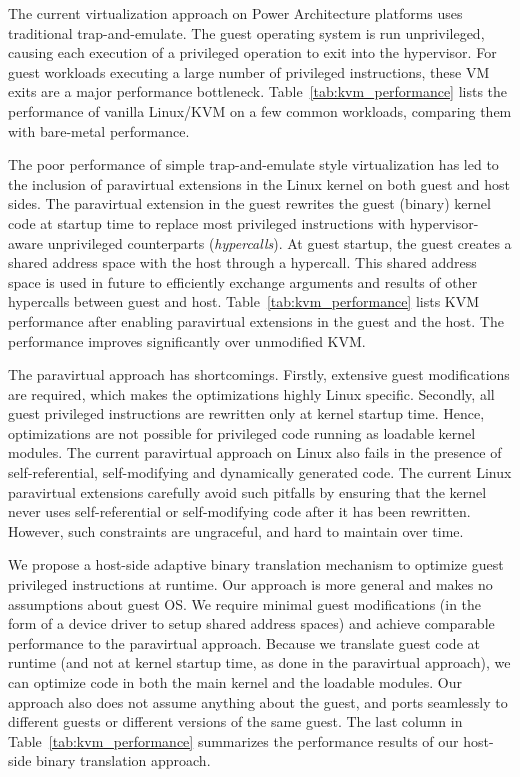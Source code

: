 \documentclass[10pt,twocolumn]{article}
\begin{document}
The current virtualization approach on Power Architecture platforms uses traditional
trap-and-emulate. The guest operating system is run unprivileged, causing each
execution of a privileged
operation to exit into the hypervisor. For guest workloads executing a large number
of privileged instructions, these VM exits are a major performance
bottleneck. Table~\ref{tab:kvm_performance} lists the performance of vanilla Linux/KVM
on a few common workloads, comparing them with bare-metal performance.

The poor performance of simple trap-and-emulate style virtualization has led to
the inclusion of paravirtual extensions in the Linux kernel on both
guest and host sides\cite{pvpower}. The paravirtual extension in the guest
rewrites the guest (binary) kernel
code at startup time to replace most privileged instructions with
hypervisor-aware unprivileged counterparts ({\em hypercalls}).
At guest startup, the guest creates a shared address space with
the host through a hypercall. This shared address space
is used in future to efficiently exchange arguments and results of other hypercalls
between guest and host.
Table~\ref{tab:kvm_performance} lists KVM performance after enabling paravirtual
extensions in the guest and the host. The performance improves significantly over
unmodified KVM.

The paravirtual approach has shortcomings. Firstly, extensive guest
modifications are required, which makes the optimizations highly Linux specific.
Secondly, all guest
privileged instructions are rewritten only at kernel startup time. Hence,
optimizations are
not possible for privileged code running as loadable kernel modules. The
current paravirtual
approach on Linux also fails in the presence of self-referential, self-modifying
and dynamically generated code. The current Linux paravirtual extensions carefully
avoid such pitfalls by ensuring that the kernel never uses self-referential
or self-modifying code after it has been rewritten. However, such constraints are
ungraceful, and hard to maintain over time.

We propose a host-side adaptive binary translation mechanism to optimize guest
privileged instructions at runtime. Our approach is more general and
makes no assumptions about guest OS. We require minimal guest
modifications (in the form of a device driver to setup shared address spaces)
and achieve
comparable performance to the paravirtual approach. Because we translate
guest code at runtime (and not at kernel startup time, as done in the paravirtual
approach), we
can optimize code in both the main kernel and the loadable modules. Our approach also
does not assume anything about the guest, and ports seamlessly to different
guests or different versions of the same guest.
The last column in Table~\ref{tab:kvm_performance} summarizes the performance results of
our host-side binary translation approach.
\end{document}
